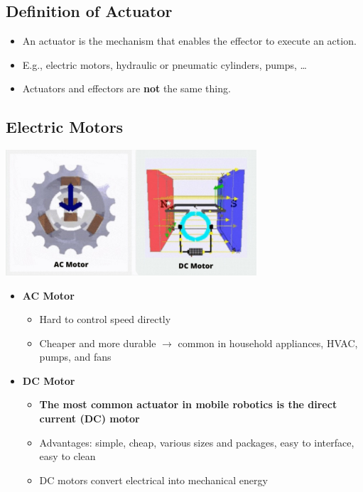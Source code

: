 \documentclass[10pt]{article}
\begin{document}
\subsection*{Definition of Actuator}
\begin{itemize}
	\item An actuator is the mechanism that enables the effector to execute an action.
	\item E.g., electric motors, hydraulic or pneumatic cylinders, pumps, \dots
	\item Actuators and effectors are \textbf{not} the same thing.
\end{itemize}

\subsection*{Electric Motors}
\begin{center} 
	\includegraphics*[width=0.7\textwidth]{L2_8.png} 
\end{center}
\begin{itemize}
	\item \textbf{AC Motor}
	\begin{itemize}
        \item Hard to control speed directly
        \item Cheaper and more durable $\rightarrow$ common in household appliances, HVAC, pumps, and fans
    \end{itemize}
    \item \textbf{DC Motor}
    \begin{itemize}
        \item \textbf{The most common actuator in mobile robotics is the direct current (DC) motor}
        \item Advantages: simple, cheap, various sizes and packages, easy to interface, easy to clean
        \item DC motors convert electrical into mechanical energy
    \end{itemize}
\end{itemize}
\end{document}
